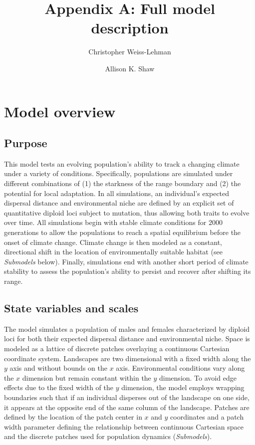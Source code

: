 \documentclass[12pt, oneside]{article}
\title{Appendix A: Full model description}
\date{}
\author[1]{Christopher Weiss-Lehman}
\author[1]{Allison K. Shaw}
\affil[1]{Ecology, Evolution, and Behavior, University of Minnesota}
\begin{document}
\maketitle

\doublespacing
\linenumbers

\renewcommand{\thefigure}{A\arabic{figure}}
\renewcommand{\thetable}{A\arabic{table}}
\renewcommand{\theequation}{A\arabic{equation}}

\section*{Model overview}
\subsection*{Purpose} 
This model tests an evolving population's ability to track a changing climate under a variety of conditions. Specifically, populations are simulated under different combinations of (1) the starkness of the range boundary and (2) the potential for local adaptation. In all simulations, an individual's expected dispersal distance and environmental niche are defined by an explicit set of quantitative diploid loci subject to mutation, thus allowing both traits to evolve over time. All simulations begin with stable climate conditions for $2000$ generations to allow the populations to reach a spatial equilibrium before the onset of climate change. Climate change is then modeled as a constant, directional shift in the location of environmentally suitable habitat (see \textit{Submodels} below). Finally, simulations end with another short period of climate stability to assess the population's ability to persist and recover after shifting its range.

\subsection*{State variables and scales} 
The model simulates a population of males and females characterized by diploid loci for both their expected dispersal distance and environmental niche. Space is modeled as a lattice of discrete patches overlaying a continuous Cartesian coordinate system. Landscapes are two dimensional with a fixed width along the $y$ axis and without bounds on the $x$ axis. Environmental conditions vary along the $x$ dimension but remain constant within the $y$ dimension. To avoid edge effects due to the fixed width of the $y$ dimension, the model employs wrapping boundaries such that if an individual disperses out of the landscape on one side, it appears at the opposite end of the same column of the landscape. Patches are defined by the location of the patch center in $x$ and $y$ coordinates and a patch width parameter defining the relationship between continuous Cartesian space and the discrete patches used for population dynamics (\textit{Submodels}). 
\end{document}

